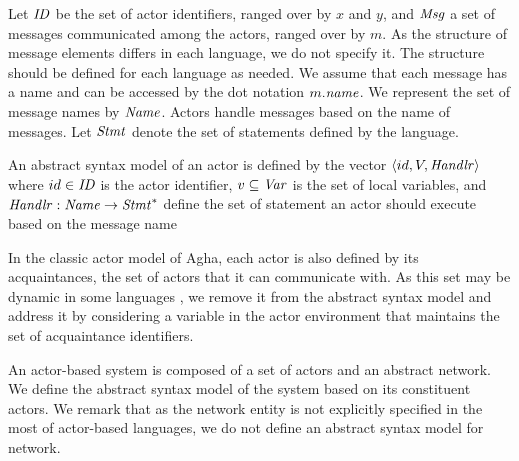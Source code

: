 Let $\mathit{ID}$ be the set of actor identifiers, ranged over by $x$ and $y$, and $\mathit{Msg}$ a set of messages communicated among the actors, ranged over by $m$. As the structure of message elements differs in each language, we do not specify it. The structure should be defined for each language as needed. %
We assume that each message has a name and can be accessed by the dot notation $m.\mathit{name}$. We represent the set of message names by $\mathit{Name}$. Actors handle messages based on the name of messages. Let $\mathit{Stmt}$ denote the set of statements defined by the language.%

\begin{defn}\label{Def::absActor}
An abstract syntax model of an actor is defined by the vector $\langle id, V,\mathit{Handlr}\rangle $ where $id\in \mathit{ID}$ is the actor identifier, $v\subseteq \mathit{Var}$ is the set of local variables, and $\mathit{Handlr} : \mathit{Name} \rightarrow \mathit{Stmt}^*$ define the set of statement an actor should execute based on the message name%
\end{defn}
In the classic actor model of Agha, each actor is also defined by its acquaintances, the set of actors that it can communicate with. As this set may be dynamic in some languages \cite{mellati}, we remove it from the abstract syntax model and address it by considering a variable in the actor environment that maintains the set of acquaintance identifiers. 

An actor-based system is composed of a set of actors and an abstract network. We define the abstract syntax model of the system based on its constituent actors. We remark that as the network entity is not explicitly specified in the most of actor-based languages, we do not define an abstract syntax model for network.  

